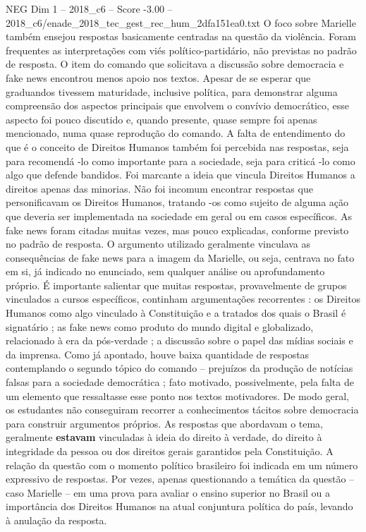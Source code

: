 \begin{textsample}{NEG Dim 1 – 2018\_c6 – Score -3.00 – 2018\_c6/enade\_2018\_tec\_gest\_rec\_hum\_2dfa151ea0.txt}
O foco sobre Marielle também ensejou respostas basicamente centradas na questão da violência.
Foram frequentes as interpretações com viés político-partidário, não previstas no padrão de resposta.
O item do comando que solicitava a discussão sobre democracia e fake news encontrou menos apoio nos textos.
Apesar de se esperar que graduandos tivessem maturidade, inclusive política, para demonstrar alguma compreensão dos aspectos principais que envolvem o convívio democrático, esse aspecto foi pouco discutido e, quando presente, quase sempre foi apenas mencionado, numa quase reprodução do comando.
A falta de entendimento do que é o conceito de Direitos Humanos também foi percebida nas respostas, seja para recomendá -lo como importante para a sociedade, seja para criticá -lo como algo que defende bandidos.
Foi marcante a ideia que vincula Direitos Humanos a direitos apenas das minorias.
Não foi incomum encontrar respostas que personificavam os Direitos Humanos, tratando -os como sujeito de alguma ação que deveria ser implementada na sociedade em geral ou em casos específicos.
As fake news foram citadas muitas vezes, mas pouco explicadas, conforme previsto no padrão de resposta.
O argumento utilizado geralmente vinculava as consequências de fake news para a imagem da Marielle, ou seja, centrava no fato em si, já indicado no enunciado, sem qualquer análise ou aprofundamento próprio.
É importante salientar que muitas respostas, provavelmente de grupos vinculados a cursos específicos, continham argumentações recorrentes : os Direitos Humanos como algo vinculado à Constituição e a tratados dos quais o Brasil é signatário ; as fake news como produto do mundo digital e globalizado, relacionado à era da pós-verdade ; a discussão sobre o papel das mídias sociais e da imprensa.
Como já apontado, houve baixa quantidade de respostas contemplando o segundo tópico do comando – prejuízos da produção de notícias falsas para a sociedade democrática ; fato motivado, possivelmente, pela falta de um elemento que ressaltasse esse ponto nos textos motivadores.
De modo geral, os estudantes não conseguiram recorrer a conhecimentos tácitos sobre democracia para construir argumentos próprios.
As respostas que abordavam o tema, geralmente \textbf{estavam} vinculadas à ideia do direito à verdade, do direito à integridade da pessoa ou dos direitos gerais garantidos pela Constituição.
A relação da questão com o momento político brasileiro foi indicada em um número expressivo de respostas.
Por vezes, apenas questionando a temática da questão – caso Marielle – em uma prova para avaliar o ensino superior no Brasil ou a importância dos Direitos Humanos na atual conjuntura política do país, levando à anulação da resposta.

\end{textsample}
